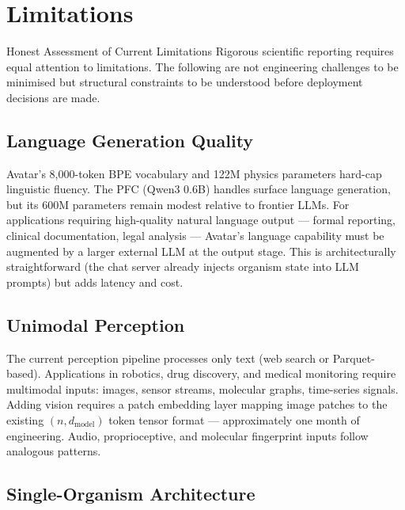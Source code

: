 \documentclass[12pt,a4paper]{article}
\begin{document}
\section{Limitations}

\begin{limitbox}{Honest Assessment of Current Limitations}
Rigorous scientific reporting requires equal attention to limitations. The following
are not engineering challenges to be minimised but structural constraints to be
understood before deployment decisions are made.
\end{limitbox}

\subsection{Language Generation Quality}

Avatar's 8{,}000-token BPE vocabulary and 122M physics parameters hard-cap linguistic
fluency. The PFC (Qwen3 0.6B) handles surface language generation, but its 600M
parameters remain modest relative to frontier LLMs. For applications requiring
high-quality natural language output --- formal reporting, clinical documentation, legal
analysis --- Avatar's language capability must be augmented by a larger external LLM at
the output stage. This is architecturally straightforward (the chat server already
injects organism state into LLM prompts) but adds latency and cost.

\subsection{Unimodal Perception}

The current perception pipeline processes only text (web search or Parquet-based).
Applications in robotics, drug discovery, and medical monitoring require multimodal
inputs: images, sensor streams, molecular graphs, time-series signals. Adding vision
requires a patch embedding layer mapping image patches to the existing $(n, d_\text{model})$
token tensor format --- approximately one month of engineering. Audio, proprioceptive,
and molecular fingerprint inputs follow analogous patterns.

\subsection{Single-Organism Architecture}
\end{document}
